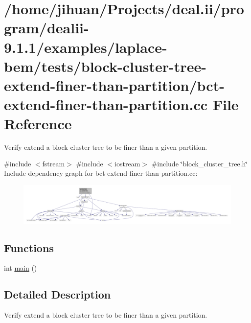 \hypertarget{bct-extend-finer-than-partition_8cc}{}\section{/home/jihuan/\+Projects/deal.ii/program/dealii-\/9.1.1/examples/laplace-\/bem/tests/block-\/cluster-\/tree-\/extend-\/finer-\/than-\/partition/bct-\/extend-\/finer-\/than-\/partition.cc File Reference}
\label{bct-extend-finer-than-partition_8cc}


Verify extend a block cluster tree to be finer than a given partition.  


{\ttfamily \#include $<$fstream$>$}\newline
{\ttfamily \#include $<$iostream$>$}\newline
{\ttfamily \#include \char`\"{}block\+\_\+cluster\+\_\+tree.\+h\char`\"{}}\newline
Include dependency graph for bct-\/extend-\/finer-\/than-\/partition.cc\+:\nopagebreak
\begin{figure}[H]
\begin{center}
\leavevmode
\includegraphics[width=350pt]{bct-extend-finer-than-partition_8cc__incl}
\end{center}
\end{figure}
\subsection*{Functions}
\begin{DoxyCompactItemize}
\item 
int \hyperlink{bct-extend-finer-than-partition_8cc_ae66f6b31b5ad750f1fe042a706a4e3d4}{main} ()
\end{DoxyCompactItemize}


\subsection{Detailed Description}
Verify extend a block cluster tree to be finer than a given partition. 

